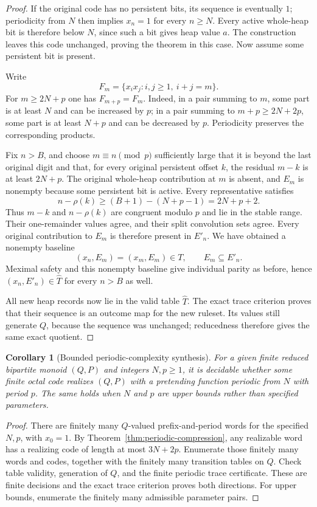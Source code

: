 \documentclass[11pt]{article}
\newtheorem{corollary}[theorem]{Corollary}
\theoremstyle{definition}
\theoremstyle{remark}
\begin{document}
\begin{proof}
If the original code has no persistent bits, its sequence is eventually
$1$; periodicity from $N$ then implies $x_n=1$ for every $n\ge N$.
Every active whole-heap bit is therefore below $N$, since such a bit gives
heap value $a$.  The construction leaves this code unchanged, proving the
theorem in this case.  Now assume some persistent bit is present.

Write
\[
 F_m=\{x_i x_j:i,j\ge1,\ i+j=m\}.
\]
For $m\ge2N+p$ one has $F_{m+p}=F_m$.
Indeed, in a pair summing to $m$, some part is at least $N$ and can be
increased by $p$; in a pair summing to $m+p\ge2N+2p$, some part is at
least $N+p$ and can be decreased by $p$.  Periodicity preserves the
corresponding products.

Fix $n>B$, and choose $m\equiv n\pmod p$ sufficiently large that it is
beyond the last original digit and that, for every original persistent
offset $k$, the residual $m-k$ is at least $2N+p$.
The original whole-heap contribution at $m$ is absent, and $E_m$ is
nonempty because some persistent bit is active.  Every representative
satisfies
\[
 n-\rho(k)\ge(B+1)-(N+p-1)=2N+p+2.
\]
Thus $m-k$ and $n-\rho(k)$ are congruent modulo $p$ and lie in the
stable range.  Their one-remainder values agree, and their split
convolution sets agree.  Every original contribution to $E_m$ is
therefore present in $E'_n$.  We have obtained a nonempty baseline
\[
 (x_n,E_m)=(x_m,E_m)\in T,\qquad E_m\subseteq E'_n.
\]
Meximal safety and this nonempty baseline give individual parity as
before, hence $(x_n,E'_n)\in\widehat T$ for every $n>B$ as well.

All new heap records now lie in the valid table $\widehat T$.
The exact trace criterion proves that their sequence is an outcome map
for the new ruleset.  Its values still generate $Q$, because the sequence
was unchanged; reducedness therefore gives the same exact quotient.
\end{proof}

\begin{corollary}[Bounded periodic-complexity synthesis]
\label{cor:bounded-periodic-synthesis}
For a given finite reduced bipartite monoid $(Q,P)$ and integers $N,p\ge1$,
it is decidable whether some finite octal code realizes $(Q,P)$ with a
pretending function periodic from $N$ with period $p$.
The same holds when $N$ and $p$ are upper bounds rather than specified
parameters.
\end{corollary}

\begin{proof}
There are finitely many $Q$-valued prefix-and-period words for the specified
$N,p$, with $x_0=1$.  By Theorem~\ref{thm:periodic-compression}, any
realizable word has a realizing code of length at most $3N+2p$.
Enumerate those finitely many words and codes, together with the finitely
many transition tables on $Q$.  Check table validity, generation of $Q$,
and the finite periodic trace certificate.  These are finite decisions
and the exact trace criterion proves both directions.
For upper bounds, enumerate the finitely many admissible parameter pairs.
\end{proof}
\end{document}
